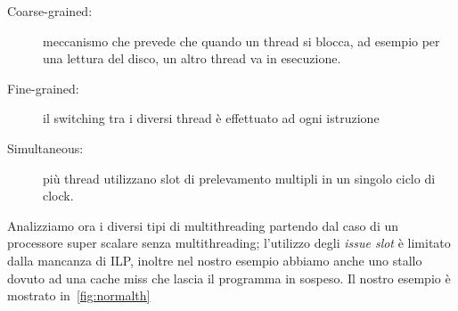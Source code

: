 \begin{description}
\item[Coarse-grained:] meccanismo che prevede che quando un thread si blocca, ad esempio per una lettura del disco, un altro thread va in esecuzione.
\item[Fine-grained:] il switching tra i diversi thread è effettuato ad ogni istruzione
\item[Simultaneous:] più thread utilizzano slot di prelevamento multipli in un singolo ciclo di clock.
\end{description}
Analizziamo ora i diversi tipi di multithreading partendo dal caso di un processore super scalare senza multithreading; l'utilizzo degli \emph{issue slot} è limitato dalla mancanza di ILP, inoltre nel nostro esempio abbiamo anche uno stallo dovuto ad una cache miss che lascia il programma in sospeso. Il nostro esempio è mostrato in \figurename\,\ref{fig:normalth}
